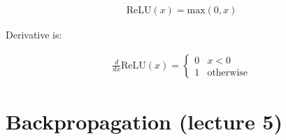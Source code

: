 \documentclass[11pt]{article}
\numberwithin{equation}{section}
\theoremstyle{definition}%
\begin{document}
\begin{align}
    \text{ReLU}(x) = \text{max}(0, x)
\end{align}

Derivative is:

\begin{align}
    \frac{d}{dx}\text{ReLU}(x) = \begin{cases}
        0 & x < 0 \\
        1 & \text{otherwise}
    \end{cases}
\end{align}

\newpage
\section{Backpropagation (lecture 5)}


\end{document}
